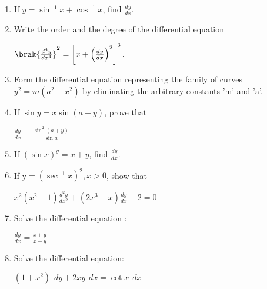 
\begin{enumerate}

 \item If $y =\sin^{-1} x + \cos^{-1} x$, find 
         $\frac{dy}{dx}$.
    \item Write the order and the degree of the differential equation
    
    \hspace{2cm}
 $\brak{\frac{d^4y}{dx^4}}^2=\left[x+\left(\frac{dy}{dx}\right)^2\right]^3.$
    \item Form the differential equation representing the family of curves $y^2=m(a^2-x^2)$ by eliminating the arbitrary constants {'m'} and  {'a'}.
    \item If $\sin y =  x  \sin (a + y)$, prove that

     \hspace{2cm}$\frac{dy}{dx} = \frac{\sin^2(a+y)}{\sin a}$
     
     
     \item If $(\sin x)^y = x+y$, find $\frac{dy}{dx}.$
     
     
     \item If y$=(\sec^{-1} x)^2 , x>0$, show that
     
     \hspace{2cm} $x^2(x^2-1)\frac{d^2y}{dx^2}+(2x^3-x)\frac{dy}{dx} -2=0$
     \item Solve the differential equation :

     \hspace{2cm}$\frac{dy}{dx}=\frac{x+y}{x-y}$

     \item Solve the differential equation:

     \hspace{2cm}$(1+x^2)\hspace{5pt}dy+2xy\hspace{5pt}   dx= \cot x \hspace{5pt} dx$
 \end{enumerate}
